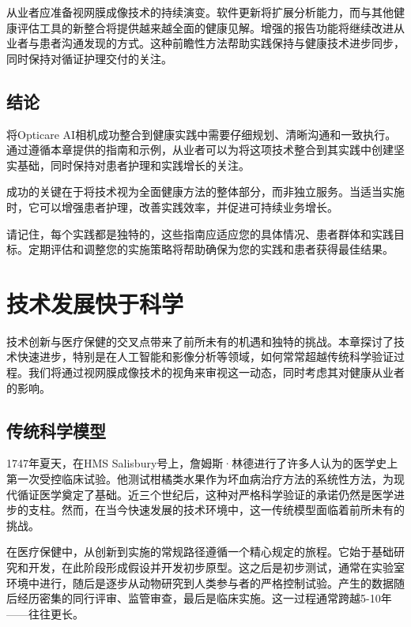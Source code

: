 \documentclass[
  Letterpaper,
]{scrbook}
\begin{document}
从业者应准备视网膜成像技术的持续演变。软件更新将扩展分析能力，而与其他健康评估工具的新整合将提供越来越全面的健康见解。增强的报告功能将继续改进从业者与患者沟通发现的方式。这种前瞻性方法帮助实践保持与健康技术进步同步，同时保持对循证护理交付的关注。

\section{结论}\label{ux7ed3ux8bba-1}

将Opticare
AI相机成功整合到健康实践中需要仔细规划、清晰沟通和一致执行。通过遵循本章提供的指南和示例，从业者可以为将这项技术整合到其实践中创建坚实基础，同时保持对患者护理和实践增长的关注。

成功的关键在于将技术视为全面健康方法的整体部分，而非独立服务。当适当实施时，它可以增强患者护理，改善实践效率，并促进可持续业务增长。

请记住，每个实践都是独特的，这些指南应适应您的具体情况、患者群体和实践目标。定期评估和调整您的实施策略将帮助确保为您的实践和患者获得最佳结果。


\chapter{技术发展快于科学}\label{ux6280ux672fux53d1ux5c55ux5febux4e8eux79d1ux5b66}

技术创新与医疗保健的交叉点带来了前所未有的机遇和独特的挑战。本章探讨了技术快速进步，特别是在人工智能和影像分析等领域，如何常常超越传统科学验证过程。我们将通过视网膜成像技术的视角来审视这一动态，同时考虑其对健康从业者的影响。

\section{传统科学模型}\label{ux4f20ux7edfux79d1ux5b66ux6a21ux578b}

1747年夏天，在HMS
Salisbury号上，詹姆斯·林德进行了许多人认为的医学史上第一次受控临床试验。他测试柑橘类水果作为坏血病治疗方法的系统性方法，为现代循证医学奠定了基础。近三个世纪后，这种对严格科学验证的承诺仍然是医学进步的支柱。然而，在当今快速发展的技术环境中，这一传统模型面临着前所未有的挑战。

在医疗保健中，从创新到实施的常规路径遵循一个精心规定的旅程。它始于基础研究和开发，在此阶段形成假设并开发初步原型。这之后是初步测试，通常在实验室环境中进行，随后是逐步从动物研究到人类参与者的严格控制试验。产生的数据随后经历密集的同行评审、监管审查，最后是临床实施。这一过程通常跨越5-10年------往往更长。
\end{document}
